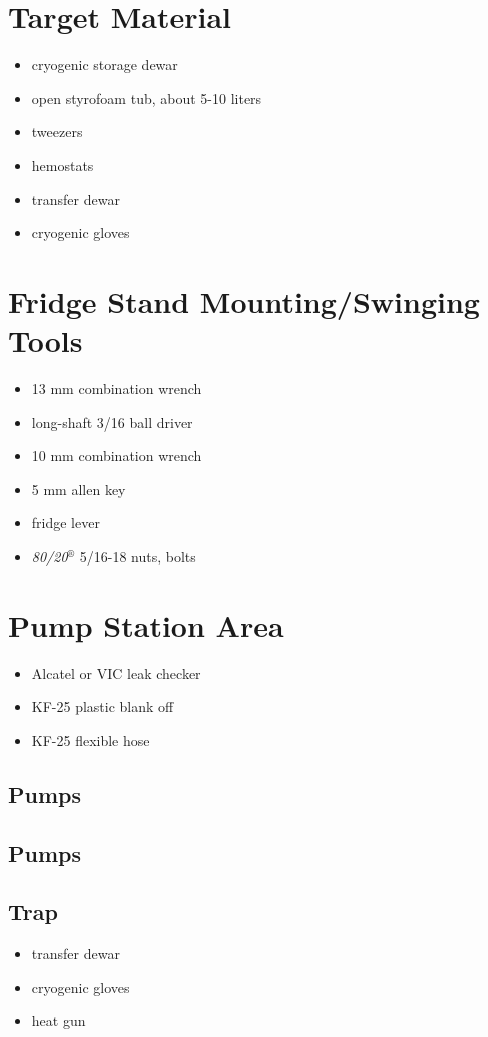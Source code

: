 \section{Target Material}
\begin{itemize}
 \item cryogenic storage \lnn{} dewar
\item open styrofoam tub, about 5-10 liters
\item tweezers
\item hemostats
\item \lnn{} transfer dewar
\item cryogenic gloves
\end{itemize}

\section{Fridge Stand Mounting/Swinging Tools}

\begin{itemize}
  \item 13 mm combination wrench
  \item long-shaft 3/16\inches{} ball driver
  \item 10 mm combination wrench
  \item 5 mm allen key
  \item fridge lever
  \item \textit{80/20$^\circledR$} 5/16\inches{}-18 nuts, bolts
\end{itemize}


\section{Pump Station Area}
  \begin{itemize}
   \item Alcatel or VIC leak checker
   \item KF-25 plastic blank off
   \item KF-25 flexible hose
  \end{itemize}

  \subsection{\het{} Pumps} %
  \subsection{\hef{} Pumps}
  \subsection{\lnn{} Trap}
\begin{itemize}
 \item \lnn transfer dewar
\item cryogenic gloves
\item heat gun
\end{itemize}

